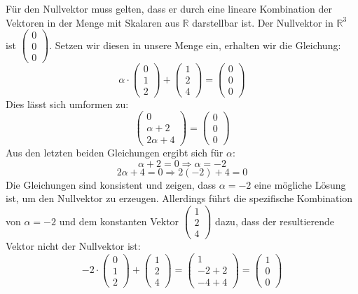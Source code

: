 \documentclass[a4paper]{scrartcl}
\begin{document}
\begin{enumerate}[label=\alph*)]
  Für den Nullvektor muss gelten, dass er durch eine lineare Kombination der Vektoren in der Menge mit Skalaren aus \(\mathbb{R}\) darstellbar ist. Der Nullvektor in \(\mathbb{R}^3\) ist \(\begin{pmatrix} 0 \\ 0 \\ 0 \end{pmatrix}\). Setzen wir diesen in unsere Menge ein, erhalten wir die Gleichung:
  \[
  \alpha \cdot \begin{pmatrix} 0 \\ 1 \\ 2 \end{pmatrix} + \begin{pmatrix} 1 \\ 2 \\ 4 \end{pmatrix} = \begin{pmatrix} 0 \\ 0 \\ 0 \end{pmatrix}
  \]
  Dies lässt sich umformen zu:
  \[
  \begin{pmatrix} 0 \\ \alpha + 2 \\ 2\alpha + 4 \end{pmatrix} = \begin{pmatrix} 0 \\ 0 \\ 0 \end{pmatrix}
  \]
  Aus den letzten beiden Gleichungen ergibt sich für \(\alpha\):
  \[
  \alpha + 2 = 0 \Rightarrow \alpha = -2
  \]
  \[
  2\alpha + 4 = 0 \Rightarrow 2(-2) + 4 = 0
  \]
  Die Gleichungen sind konsistent und zeigen, dass \(\alpha = -2\) eine mögliche Lösung ist, um den Nullvektor zu erzeugen. Allerdings führt die spezifische Kombination von \(\alpha = -2\) und dem konstanten Vektor \(\begin{pmatrix} 1 \\ 2 \\ 4 \end{pmatrix}\) dazu, dass der resultierende Vektor nicht der Nullvektor ist:
  \[
  -2 \cdot \begin{pmatrix} 0 \\ 1 \\ 2 \end{pmatrix} + \begin{pmatrix} 1 \\ 2 \\ 4 \end{pmatrix} = \begin{pmatrix} 1 \\ -2 + 2 \\ -4 + 4 \end{pmatrix} = \begin{pmatrix} 1 \\ 0 \\ 0 \end{pmatrix}
\]
\end{enumerate}
\end{document}
